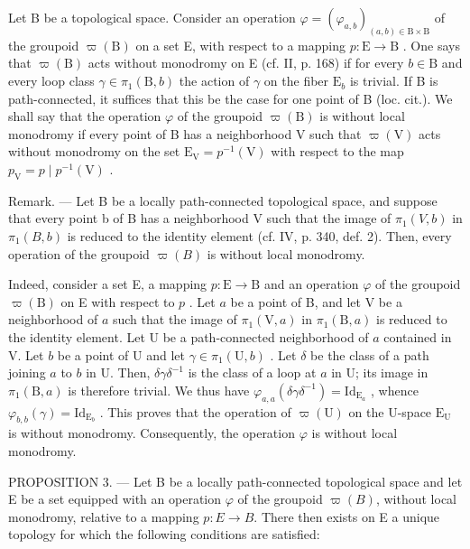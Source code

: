 Let B be a topological space. Consider an operation \(\varphi = (\varphi_{a,b})_{(a,b)\in \mathrm{B}\times \mathrm{B}}\) of the groupoid \(\varpi (\mathrm{B})\) on a set E, with respect to a mapping \(p\colon \mathrm{E}\to \mathrm{B}\) . One says that \(\varpi (\mathrm{B})\) acts without monodromy on E (cf. II, p. 168) if for every \(b\in \mathrm{B}\) and every loop class \(\gamma \in \pi_1(\mathrm{B},b)\) the action of \(\gamma\) on the fiber \(\mathrm{E}_b\) is trivial. If B is path-connected, it suffices that this be the case for one point of B (loc. cit.). We shall say that the operation \(\varphi\) of the groupoid \(\varpi (\mathrm{B})\) is without local monodromy if every point of B has a neighborhood V such that \(\varpi (\mathrm{V})\) acts without monodromy on the set \(\mathrm{E_V} = p^{-1}(\mathrm{V})\) with respect to the map \(p_{\mathrm{V}} = p\mid p^{-1}(\mathrm{V})\) .

Remark. --- Let B be a locally path-connected topological space, and suppose that every point b of B has a neighborhood V such that the image of \(\pi_{1}(V,b)\) in \(\pi_{1}(B,b)\) is reduced to the identity element (cf. IV, p. 340, def. 2). Then, every operation of the groupoid \(\varpi(B)\) is without local monodromy.

Indeed, consider a set E, a mapping \(p \colon \mathrm{E} \to \mathrm{B}\) and an operation \(\varphi\) of the groupoid \(\varpi(\mathrm{B})\) on E with respect to \(p\) . Let \(a\) be a point of B, and let V be a neighborhood of \(a\) such that the image of \(\pi_1(\mathrm{V}, a)\) in \(\pi_1(\mathrm{B}, a)\) is reduced to the identity element. Let U be a path-connected neighborhood of \(a\) contained in V. Let \(b\) be a point of U and let \(\gamma \in \pi_1(\mathrm{U}, b)\) . Let \(\delta\) be the class of a path joining \(a\) to \(b\) in U. Then, \(\delta\gamma\delta^{-1}\) is the class of a loop at \(a\) in U; its image in \(\pi_1(\mathrm{B}, a)\) is therefore trivial. We thus have \(\varphi_{a,a}(\delta\gamma\delta^{-1}) = \mathrm{Id}_{\mathrm{E}_a}\) , whence \(\varphi_{b,b}(\gamma) = \mathrm{Id}_{\mathrm{E}_b}\) . This proves that the operation of \(\varpi(\mathrm{U})\) on the U-space \(\mathrm{E_U}\) is without monodromy. Consequently, the operation \(\varphi\) is without local monodromy.

PROPOSITION 3. --- Let B be a locally path-connected topological space and let E be a set equipped with an operation \(\varphi\) of the groupoid \(\varpi(B)\), without local monodromy, relative to a mapping \(p: E \to B\). There then exists on E a unique topology for which the following conditions are satisfied:

